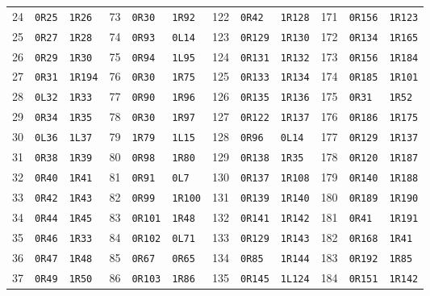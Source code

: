 \begin{center}
\begin{tabular}{rll@{\hspace{12pt}}rll@{\hspace{12pt}}rll@{\hspace{12pt}}rll}
24 & \texttt{0R25} & \texttt{1R26} & 73 & \texttt{0R30} & \texttt{1R92} & 122 & \texttt{0R42} & \texttt{1R128} & 171 & \texttt{0R156} & \texttt{1R123}\\
25 & \texttt{0R27} & \texttt{1R28} & 74 & \texttt{0R93} & \texttt{0L14} & 123 & \texttt{0R129} & \texttt{1R130} & 172 & \texttt{0R134} & \texttt{1R165}\\
26 & \texttt{0R29} & \texttt{1R30} & 75 & \texttt{0R94} & \texttt{1L95} & 124 & \texttt{0R131} & \texttt{1R132} & 173 & \texttt{0R156} & \texttt{1R184}\\
27 & \texttt{0R31} & \texttt{1R194} & 76 & \texttt{0R30} & \texttt{1R75} & 125 & \texttt{0R133} & \texttt{1R134} & 174 & \texttt{0R185} & \texttt{1R101}\\
28 & \texttt{0L32} & \texttt{1R33} & 77 & \texttt{0R90} & \texttt{1R96} & 126 & \texttt{0R135} & \texttt{1R136} & 175 & \texttt{0R31} & \texttt{1R52}\\
29 & \texttt{0R34} & \texttt{1R35} & 78 & \texttt{0R30} & \texttt{1R97} & 127 & \texttt{0R122} & \texttt{1R137} & 176 & \texttt{0R186} & \texttt{1R175}\\
30 & \texttt{0L36} & \texttt{1L37} & 79 & \texttt{1R79} & \texttt{1L15} & 128 & \texttt{0R96} & \texttt{0L14} & 177 & \texttt{0R129} & \texttt{1R137}\\
31 & \texttt{0R38} & \texttt{1R39} & 80 & \texttt{0R98} & \texttt{1R80} & 129 & \texttt{0R138} & \texttt{1R35} & 178 & \texttt{0R120} & \texttt{1R187}\\
32 & \texttt{0R40} & \texttt{1R41} & 81 & \texttt{0R91} & \texttt{0L7} & 130 & \texttt{0R137} & \texttt{1R108} & 179 & \texttt{0R140} & \texttt{1R188}\\
33 & \texttt{0R42} & \texttt{1R43} & 82 & \texttt{0R99} & \texttt{1R100} & 131 & \texttt{0R139} & \texttt{1R140} & 180 & \texttt{0R189} & \texttt{1R190}\\
34 & \texttt{0R44} & \texttt{1R45} & 83 & \texttt{0R101} & \texttt{1R48} & 132 & \texttt{0R141} & \texttt{1R142} & 181 & \texttt{0R41} & \texttt{1R191}\\
35 & \texttt{0R46} & \texttt{1R33} & 84 & \texttt{0R102} & \texttt{0L71} & 133 & \texttt{0R129} & \texttt{1R143} & 182 & \texttt{0R168} & \texttt{1R41}\\
36 & \texttt{0R47} & \texttt{1R48} & 85 & \texttt{0R67} & \texttt{0R65} & 134 & \texttt{0R85} & \texttt{1R144} & 183 & \texttt{0R192} & \texttt{1R85}\\
37 & \texttt{0R49} & \texttt{1R50} & 86 & \texttt{0R103} & \texttt{1R86} & 135 & \texttt{0R145} & \texttt{1L124} & 184 & \texttt{0R151} & \texttt{1R142}\\

\end{tabular}
\end{center}
